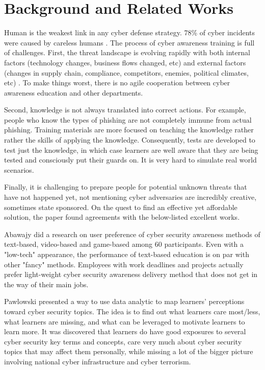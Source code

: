 \documentclass[conference]{IEEEtran}
\begin{document}
\section{Background and Related Works}
Human is the weakest link in any cyber defense strategy. 78\% of cyber incidents were caused by careless humans \cite{PonemonInstitute20172017Overview}. The process of cyber awareness training is full of challenges. First, the threat landscape is evolving rapidly with both internal factors (technology changes, business flows changed, etc) and external factors (changes in supply chain, compliance, competitors, enemies, political climates, etc) \cite{Ingalsbe2008ThreatEnd, Manadhata2011AnMetric}. To make things worst, there is no agile cooperation between cyber awareness education and other departments. 

Second, knowledge is not always translated into correct actions. For example, people who know the types of phishing are not completely immune from actual phishing. Training materials are more focused on teaching the knowledge rather rather the skills of applying the knowledge. Consequently, tests are developed to test just the knowledge, in which case learners are well aware that they are being tested and consciously put their guards on. It is very hard to simulate real world scenarios.

Finally, it is challenging to prepare people for potential unknown threats that have not happened yet, not mentioning cyber adversaries are incredibly creative, sometimes state sponsored. On the quest to find an effective yet affordable solution, the paper found agreements with the below-listed excellent works.

Abawajy \cite{Abawajy2014UserMethods} did a research on user preference of cyber security awareness methods of text-based, video-based and game-based among 60 participants. Even with a "low-tech" appearance, the performance of text-based education is on par with other "fancy" methods. Employees with work deadlines and projects actually prefer light-weight cyber security awareness delivery method that does not get in the way of their main jobs.

Pawlowski \cite{Pawlowski2016SocialDesign} presented a way to use data analytic to map learners' perceptions toward cyber security topics. The idea is to find out what learners care most/less, what learners are missing, and what can be leveraged to motivate learners to learn more. It was discovered that learners do have good exposures to several cyber security key terms and concepts, care very much about cyber security topics that may affect them personally, while missing a lot of the bigger picture involving national cyber infrastructure and cyber terrorism.
\end{document}
